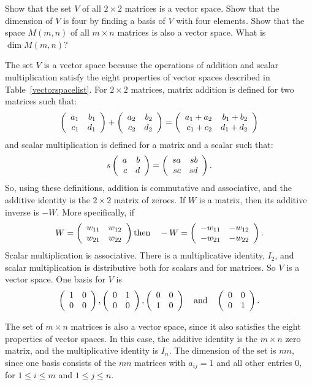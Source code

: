 \documentclass{ximera}
\begin{document}
\begin{exercise} \label{c5.5.4}
Show that the set $V$ of all $2\times 2$ matrices is a vector space.
Show that the dimension of $V$ is four by finding a basis of $V$
with four elements.  Show that the space $M(m,n)$ of all $m\times n$
matrices is also a vector space.  What is $\dim M(m,n)$?

\begin{solution}

The set $V$ is a vector space because the operations of addition and
scalar multiplication satisfy the eight properties of
vector spaces described in Table~\ref{vectorspacelist}.  For $2 \times
2$ matrices, matrix addition is defined for two matrices such that:
\[
\left(\begin{array}{rr} a_1 & b_1\\ c_1 &d_1\end{array}\right) + \left(\begin{array}{rr} a_2 & b_2\\ c_2 &d_2\end{array}\right) =
\left(\begin{array}{rr} a_1 + a_2 & b_1 + b_2\\ c_1 + c_2 &d_1 + d_2\end{array}\right)
\]
and scalar multiplication is defined for a matrix and a scalar such that:
\[
s\left(\begin{array}{rr} a & b\\ c &d\end{array}\right) = \left(\begin{array}{rr} sa & sb\\ sc &sd\end{array}\right).
\]
So, using these definitions, addition is commutative and associative,
and the additive identity is the $2 \times 2$ matrix of zeroes.  
If $W$ is a matrix, then its additive inverse is $-W$.  
More specifically, if 
\[
W = \left(\begin{array}{rr} w_{11} & w_{12}\\ w_{21} &w_{22}\end{array}\right) \mbox{then}
\quad -W = \left(\begin{array}{rr} -w_{11} & -w_{12}\\ -w_{21} &-w_{22}\end{array}\right).
\]
Scalar multiplication is associative.  There is a multiplicative
identity, $I_2$, and scalar multiplication is distributive both
for scalars and for matrices.  So $V$ is a vector space.  One basis
for $V$ is
\[
\left(\begin{array}{rr} 1 & 0\\ 0 &0\end{array}\right), \left(\begin{array}{rr} 0 & 1\\ 0 &0\end{array}\right), \left(\begin{array}{rr} 0 & 0\\ 1 &0\end{array}\right)
\quad\mbox{and}\quad \left(\begin{array}{rr} 0 & 0\\ 0 &1\end{array}\right).
\]

\para The set of $m \times n$ matrices is also a vector space, since
it also satisfies the eight properties of vector spaces.  In this
case, the additive identity is the $m \times n$ zero matrix, and
the multiplicative identity is $I_n$.  The dimension of the set is
$mn$, since one basis consists of the $mn$ matrices with $a_{ij}
= 1$ and all other entries $0$, for $1 \leq i \leq m$ and $1 \leq j
\leq n$.

\end{solution}
\end{exercise}
\end{document}
